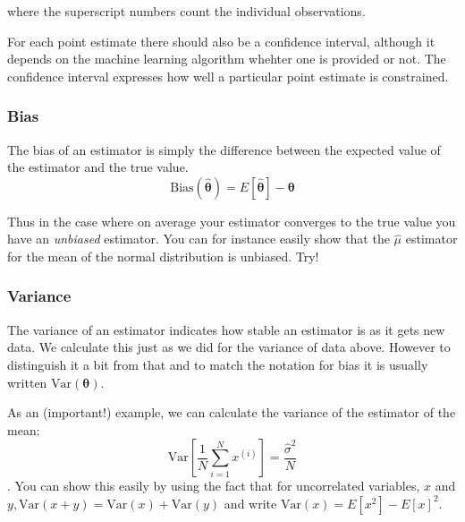 \documentclass[a4paper,10pt]{article}
\begin{document}
where the superscript numbers count the individual observations.

For each point estimate there should also be a confidence interval, although it depends on the machine learning algorithm whehter one is provided or not. The confidence interval expresses how well a particular point estimate is constrained.

\subsubsection{ Bias}

The bias of an estimator is simply the difference between the expected value of the estimator and the true value.
$$\mathrm{Bias}(\hat{\boldsymbol{\theta}}) = E\left[\hat{\boldsymbol{\theta}}\right] - \boldsymbol{\theta} $$

Thus in the case where on average your estimator converges to the true value you have an \textit{unbiased} estimator. You can for instance easily show that the $\hat{\mu}$ estimator for the mean of the normal distribution is unbiased. Try!

\subsubsection{ Variance}

The variance of an estimator indicates how stable an estimator is as it gets new data. We calculate this just as we did for the variance of data above. However to distinguish it a bit from that and to match the notation for bias it is usually written $\mathrm{Var}(\boldsymbol{\theta})$.

As an (important!) example, we can calculate the variance of the estimator of the mean:
$$\mathrm{Var}\left[\frac{1}{N} \sum_{i=1}^N x^{(i)}\right] = \frac{\hat{\sigma}^2}{N}$$.
You can show this easily by using the fact that for uncorrelated variables, $x$ and $y, \mathrm{Var}(x+y) = \mathrm{Var}(x) + \mathrm{Var}(y)$ and write $\mathrm{Var}(x) = E\left[x^2
\right] - E\left[x\right]^2$.
\end{document}
